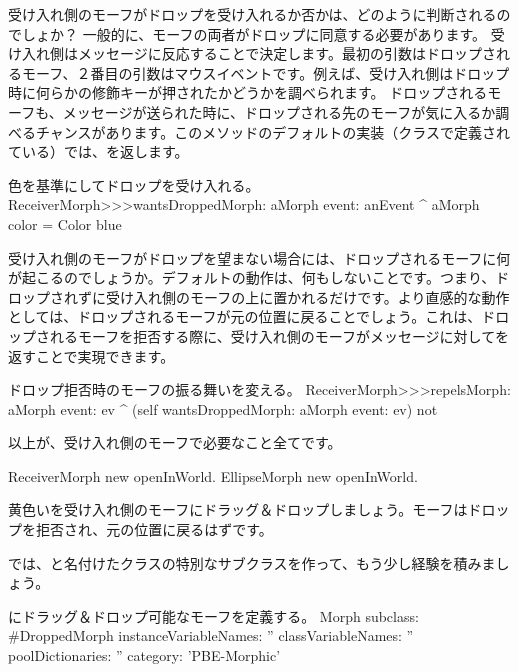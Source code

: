 \documentclass[a4paper,10pt,twoside]{book}
\begin{document}
受け入れ側のモーフがドロップを受け入れるか否かは、どのように判断されるのでしょか？
一般的に、モーフの両者がドロップに同意する必要があります。
受け入れ側はメッセージに反応することで決定します。最初の引数はドロップされるモーフ、２番目の引数はマウスイベントです。例えば、受け入れ側はドロップ時に何らかの修飾キーが押されたかどうかを調べられます。
ドロップされるモーフも、メッセージが送られた時に、ドロップされる先のモーフが気に入るか調べるチャンスがあります。このメソッドのデフォルトの実装（クラスで定義されている）では、を返します。

\begin{method}{色を基準にしてドロップを受け入れる。}
ReceiverMorph>>>wantsDroppedMorph: aMorph event: anEvent
	^ aMorph color = Color blue
\end{method}

受け入れ側のモーフがドロップを望まない場合には、ドロップされるモーフに何が起こるのでしょうか。デフォルトの動作は、何もしないことです。つまり、ドロップされずに受け入れ側のモーフの上に置かれるだけです。より直感的な動作としては、ドロップされるモーフが元の位置に戻ることでしょう。これは、ドロップされるモーフを拒否する際に、受け入れ側のモーフがメッセージに対してを返すことで実現できます。

\begin{method}{ドロップ拒否時のモーフの振る舞いを変える。}
ReceiverMorph>>>repelsMorph: aMorph event: ev
	^ (self wantsDroppedMorph: aMorph event: ev) not
\end{method}

以上が、受け入れ側のモーフで必要なこと全てです。

\begin{code}{}
ReceiverMorph new openInWorld.
EllipseMorph new openInWorld.
\end{code}
\noindent
黄色いを受け入れ側のモーフにドラッグ＆ドロップしましょう。モーフはドロップを拒否され、元の位置に戻るはずです。


では、と名付けたクラスの特別なサブクラスを作って、もう少し経験を積みましょう。

\begin{classdef}{にドラッグ＆ドロップ可能なモーフを定義する。}
Morph subclass: #DroppedMorph
	instanceVariableNames: ''
	classVariableNames: ''
	poolDictionaries: ''
	category: 'PBE-Morphic'
\end{classdef}
\end{document}
